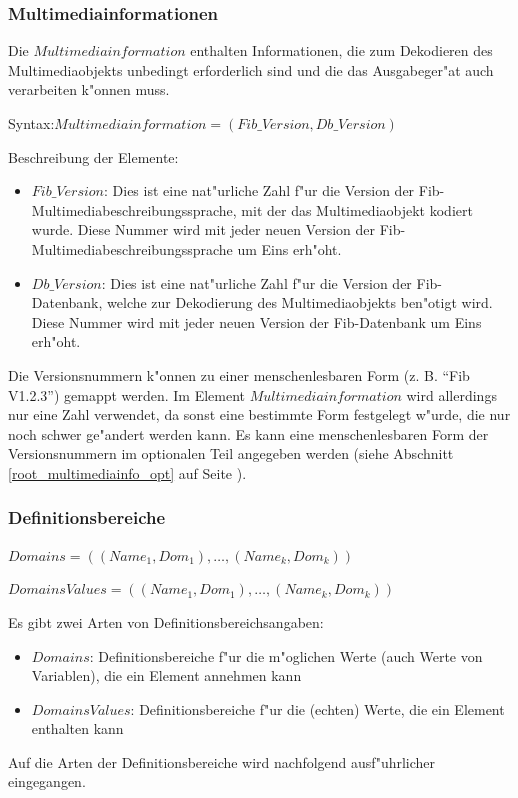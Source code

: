 \subsubsection{Multimediainformationen}
\label{root_multimediainfo}

Die $Multimediainformation$ enthalten Informationen, die zum Dekodieren des Multimediaobjekts unbedingt erforderlich sind und die das Ausgabeger"at auch verarbeiten k"onnen muss.

\bigskip\noindent
Syntax:$Multimediainformation = ( Fib\_Version, Db\_Version )$

\bigskip\noindent
Beschreibung der Elemente:
\begin{itemize}
 \item $Fib\_Version$: Dies ist eine nat"urliche Zahl f"ur die Version der Fib-Multi\-media\-be\-schrei\-bungs\-sprache, mit der das Multimediaobjekt kodiert wurde. Diese Nummer wird mit jeder neuen Version der Fib-Multi\-media\-be\-schrei\-bungs\-sprache um Eins erh"oht.
 \item $Db\_Version$: Dies ist eine nat"urliche Zahl f"ur die Version der Fib-Datenbank, welche zur Dekodierung des Multimediaobjekts ben"otigt wird. Diese Nummer wird mit jeder neuen Version der Fib-Datenbank um Eins erh"oht.
\end{itemize}

Die Versionsnummern k"onnen zu einer menschenlesbaren Form (z. B. ``Fib V1.2.3'') gemappt werden. Im Element $Multimediainformation$ wird allerdings nur eine Zahl verwendet, da sonst eine bestimmte Form festgelegt w"urde, die nur noch schwer ge"andert werden kann. Es kann eine menschenlesbaren Form der Versionsnummern im optionalen Teil angegeben werden (siehe Abschnitt \ref{root_multimediainfo_opt} auf Seite \pageref{root_multimediainfo_opt}).


\subsubsection{Definitionsbereiche}
\label{root_definition_ranges}

$Domains=( (Name_1, Dom_1), \ldots , (Name_k, Dom_k) )$

\bigskip\noindent
$DomainsValues=( (Name_1, Dom_1), \ldots , (Name_k, Dom_k) )$

\bigskip\noindent
Es gibt zwei Arten von Definitionsbereichsangaben:
\begin{itemize}
 \item $Domains$: Definitionsbereiche f"ur die m"oglichen Werte (auch Werte von Variablen), die ein Element annehmen kann
 \item $DomainsValues$: Definitionsbereiche f"ur die (echten) Werte, die ein Element enthalten kann
\end{itemize}
Auf die Arten der Definitionsbereiche wird nachfolgend ausf"uhrlicher eingegangen.

